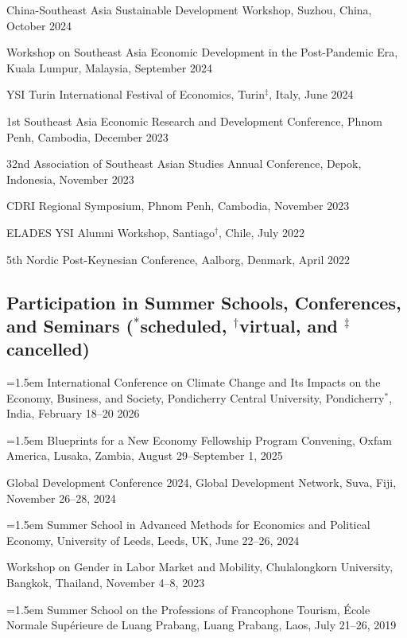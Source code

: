 \documentclass[10pt,a4paper]{article}
\begin{document}
China-Southeast Asia Sustainable Development Workshop, Suzhou, China, October 2024

Workshop on Southeast Asia Economic Development in the Post-Pandemic Era, Kuala Lumpur, Malaysia, September 2024

YSI Turin International Festival of Economics, Turin$^\ddag$, Italy, June 2024

1st Southeast Asia Economic Research and Development Conference, Phnom Penh, Cambodia, December 2023

32nd Association of Southeast Asian Studies Annual Conference, Depok, Indonesia, November 2023

CDRI Regional Symposium, Phnom Penh, Cambodia, November 2023

ELADES YSI Alumni Workshop, Santiago$^\dag$, Chile, July 2022

5th Nordic Post-Keynesian Conference, Aalborg, Denmark, April 2022

\subsection*{Participation in Summer Schools, Conferences, and Seminars ($^\ast$scheduled, $^\dag$virtual, and $^\ddag$cancelled)}

\hangindent=1.5em
International Conference on Climate Change and Its Impacts on the Economy, Business, and Society, Pondicherry Central University, Pondicherry$^\ast$, India, February 18--20 2026 

\hangindent=1.5em
Blueprints for a New Economy Fellowship Program Convening, Oxfam America, Lusaka, Zambia, August 29--September 1, 2025

Global Development Conference 2024, Global Development Network, Suva, Fiji, November 26--28, 2024 

\hangindent=1.5em
Summer School in Advanced Methods for Economics and Political Economy, University of Leeds, Leeds, UK, June 22--26, 2024

Workshop on Gender in Labor Market and Mobility, Chulalongkorn University, Bangkok, Thailand, November 4--8, 2023

\hangindent=1.5em
Summer School on the Professions of Francophone Tourism, École Normale Supérieure de Luang Prabang, Luang Prabang, Laos, July 21–26, 2019
\end{document}

